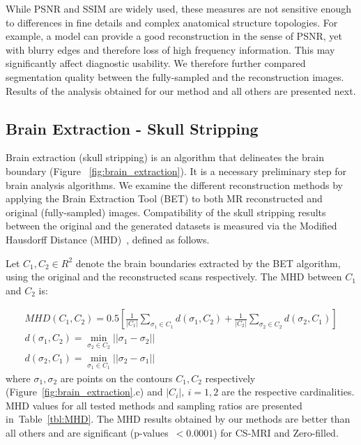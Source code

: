 \documentclass[review]{elsarticle}
\begin{document}
While PSNR and SSIM are widely used, these measures are not sensitive enough to differences in fine details and complex anatomical structure topologies. For example, a model can provide a good reconstruction in the sense of PSNR, yet with blurry edges and therefore loss of high frequency information. This may significantly affect diagnostic usability. We therefore further compared segmentation quality between the fully-sampled and the reconstruction images. Results of the analysis obtained for our method and all others are presented next.

\subsection{Brain Extraction - Skull Stripping}
Brain extraction (skull stripping) is an algorithm that delineates the brain boundary (Figure~ \ref{fig:brain_extraction}). It is a necessary preliminary step for brain analysis algorithms.
We examine the different reconstruction methods by applying the Brain Extraction Tool (BET) \cite{smith2002fast} to both MR reconstructed and original (fully-sampled) images. Compatibility of the skull stripping results between the original and the generated datasets is measured via the Modified Hausdorff Distance (MHD)~\cite{dubuisson1994modified}, defined as follows.

Let $C_1,C_2\in R^2$ denote the brain boundaries extracted by the BET algorithm, using the original and the reconstructed scans respectively. The MHD between $C_1$ and $C_2$ is:

\begin{equation}
\begin{array}{cc}
MHD(C_1,C_2) = 0.5 \left[{\frac{1}{|C_1|} \sum_{\sigma_{1}\in C_1}^{}d(\sigma_1,C_2) + \frac{1}{|C_2|} \sum_{\sigma_{2}\in C_2}^{}d(\sigma_2,C_1)}\right] \\
d(\sigma_1,C_2) = \underset{\sigma_{2}\in C_{2}}{\min}||\sigma_1-\sigma_2|| \\
d(\sigma_2,C_1) = \underset{\sigma_{1}\in C_{1}}{\min}||\sigma_2-\sigma_1||
\end{array}
\end{equation}
where $\sigma_1,\sigma_2$ are points on the contours $C_1,C_2$ respectively (Figure~\ref{fig:brain_extraction}.c) and $|C_i|,~i=1,2$ are the respective cardinalities. MHD values for all tested methods and sampling ratios are presented in~Table~\ref{tbl:MHD}. The MHD results obtained by our methods are better than all others and are significant (p-values~$<0.0001$) for CS-MRI and Zero-filled.
\end{document}
